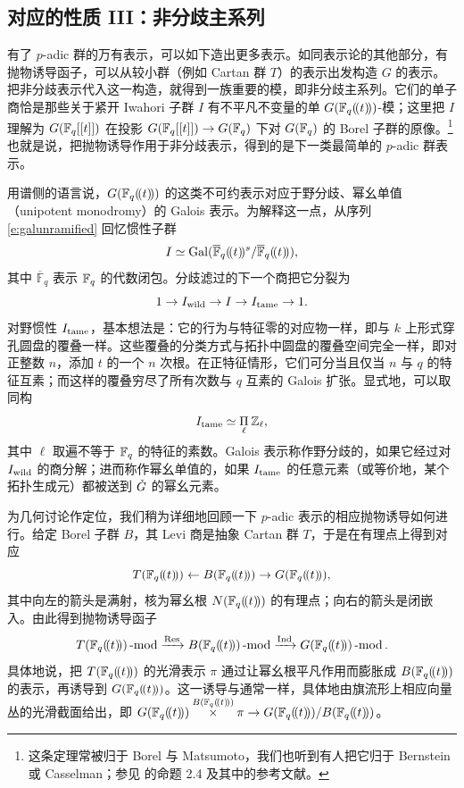 \subsection{对应的性质 III：非分歧主系列}

\label{s:unramps}
\ssszh 有了 $p$-adic 群的万有表示，可以如下造出更多表示。如同表示论的其他部分，有抛物诱导函子，可以从较小群（例如 Cartan 群 $T$）的表示出发构造 $G$ 的表示。把非分歧表示代入这一构造，就得到一族重要的模，即非分歧主系列。它们的单子商恰是那些关于紧开 Iwahori 子群 $I$ 有不平凡不变量的单 $G(\mathbb{F}_q(\!(t)\!))$-模；这里把 $I$ 理解为 $G(\mathbb{F}_q[[t]])$ 在投影 $G(\mathbb{F}_q[[t]]) \rightarrow G(\mathbb{F}_q)$ 下对 $G(\mathbb{F}_q)$ 的 Borel 子群的原像。\footnote{这条定理常被归于 Borel 与 Matsumoto，我们也听到有人把它归于 Bernstein 或 Casselman；参见 \cite{cass80spherical} 的命题 2.4 及其中的参考文献。}也就是说，把抛物诱导作用于非分歧表示，得到的是下一类最简单的 $p$-adic 群表示。

用谱侧的语言说，$G(\mathbb{F}_q(\!(t)\!))$ 的这类不可约表示对应于野分歧、幂幺单值（unipotent monodromy）的 Galois 表示。为解释这一点，从序列 \eqref{e:galunramified} 回忆惯性子群
%
\[
   I \simeq \operatorname{Gal}( \overline{\mathbb{F}}_q(\!(t)\!)^s / \overline{\mathbb{F}}_q(\!(t)\!)),
\]
%
其中 $\overline{\mathbb{F}}_q$ 表示 $\mathbb{F}_q$ 的代数闭包。分歧滤过的下一个商把它分裂为
%
\[
	    1 \rightarrow I_{\operatorname{wild}} \rightarrow I \rightarrow I_{\operatorname{tame}} \rightarrow 1.
\]
%
对野惯性 $I_{\operatorname{tame}}$，基本想法是：它的行为与特征零的对应物一样，即与 $k$ 上形式穿孔圆盘的覆叠一样。这些覆叠的分类方式与拓扑中圆盘的覆叠空间完全一样，即对正整数 $n$，添加 $t$ 的一个 $n$ 次根。在正特征情形，它们可分当且仅当 $n$ 与 $q$ 的特征互素；而这样的覆叠穷尽了所有次数与 $q$ 互素的 Galois 扩张。显式地，可以取同构
%
\[
   I_{\operatorname{tame}} \simeq \underset{\ell} \Pi \hspace{.7mm} \mathbb{Z}_\ell,
\]
%
其中 $\ell$ 取遍不等于 $\mathbb{F}_q$ 的特征的素数。Galois 表示称作野分歧的，如果它经过对 $I_{\operatorname{wild}}$ 的商分解；进而称作幂幺单值的，如果 $I_{\operatorname{tame}}$ 的任意元素（或等价地，某个拓扑生成元）都被送到 $\check{G}$ 的幂幺元素。



\ssszh 为几何讨论作定位，我们稍为详细地回顾一下 $p$-adic 表示的相应抛物诱导如何进行。给定 Borel 子群 $B$，其 Levi 商是抽象 Cartan 群 $T$，于是在有理点上得到对应
%
\[
	    T(\mathbb{F}_q(\!(t)\!)) \leftarrow B(\mathbb{F}_q(\!(t)\!)) \rightarrow G(\mathbb{F}_q(\!(t)\!)),
\]
%
其中向左的箭头是满射，核为幂幺根 $N(\mathbb{F}_q(\!(t)\!))$ 的有理点；向右的箭头是闭嵌入。由此得到抛物诱导函子
%
\begin{equation} \label{e:parindpadic}
	    T(\mathbb{F}_q(\!(t)\!))\operatorname{-mod} \xrightarrow{\operatorname{Res}} B(\mathbb{F}_q(\!(t)\!))\operatorname{-mod} \xrightarrow{\operatorname{Ind}}
	    G(\mathbb{F}_q(\!(t)\!))\operatorname{-mod}.
\end{equation}
%
具体地说，把 $T(\mathbb{F}_q(\!(t)\!))$ 的光滑表示 $\pi$ 通过让幂幺根平凡作用而膨胀成 $B(\mathbb{F}_q(\!(t)\!))$ 的表示，再诱导到 $G(\mathbb{F}_q(\!(t)\!))$。这一诱导与通常一样，具体地由旗流形上相应向量丛的光滑截面给出，即 $G(\Fqt) \overset{B(\Fqt)} \times \pi \rightarrow G(\Fqt)/B(\Fqt)$。



